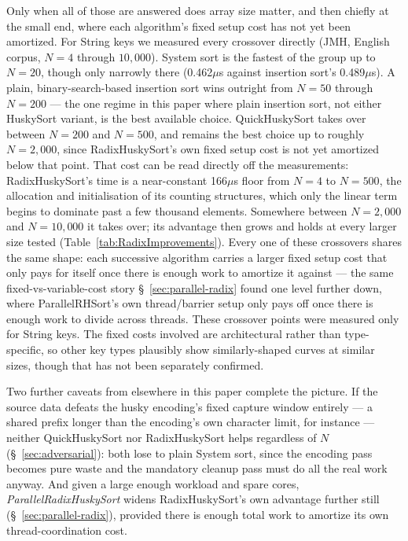 \documentclass[twoside,leqno,twocolumn]{article}
\begin{document}
Only when all of those are answered does array size matter, and then chiefly at the small end,
where each algorithm's fixed setup cost has not yet been amortized.
For String keys we measured every crossover directly (JMH, English corpus, $N=4$ through $10{,}000$).
System sort is the fastest of the group up to $N=20$, though only narrowly there
(0.462$\mu$s against insertion sort's 0.489$\mu$s).
A plain, binary-search-based insertion sort wins outright from $N=50$ through $N=200$ —
the one regime in this paper where plain insertion sort,
not either HuskySort variant, is the best available choice.
QuickHuskySort takes over between $N=200$ and $N=500$, and remains the best choice up to roughly $N=2{,}000$,
since RadixHuskySort's own fixed setup cost is not yet amortized below that point.
That cost can be read directly off the measurements: RadixHuskySort's time is a near-constant
166$\mu$s floor from $N=4$ to $N=500$, the allocation and initialisation of its counting structures,
which only the linear term begins to dominate past a few thousand elements.
Somewhere between $N=2{,}000$ and $N=10{,}000$ it takes over;
its advantage then grows and holds at every larger size tested (Table~\ref{tab:RadixImprovements}).
Every one of these crossovers shares the same shape:
each successive algorithm carries a larger fixed setup cost that only pays for itself once there is enough work to amortize it against —
the same fixed-vs-variable-cost story \S~\ref{sec:parallel-radix} found one level further down,
where ParallelRHSort's own thread/barrier setup only pays off once there is enough work to divide across threads.
These crossover points were measured only for String keys.
The fixed costs involved are architectural rather than type-specific,
so other key types plausibly show similarly-shaped curves at similar sizes,
though that has not been separately confirmed.

Two further caveats from elsewhere in this paper complete the picture.
If the source data defeats the husky encoding's fixed capture window entirely —
a shared prefix longer than the encoding's own character limit, for instance —
neither QuickHuskySort nor RadixHuskySort helps regardless of $N$ (\S~\ref{sec:adversarial}):
both lose to plain System sort, since the encoding pass becomes pure waste and the mandatory cleanup pass must do all the real work anyway.
And given a large enough workload and spare cores, \textit{ParallelRadixHuskySort}
widens RadixHuskySort's own advantage further still (\S~\ref{sec:parallel-radix}),
provided there is enough total work to amortize its own thread-coordination cost.
\end{document}
